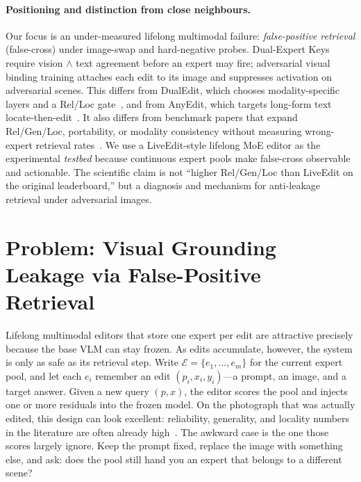 \documentclass[letterpaper]{article} %
\begin{document}
\paragraph{Positioning and distinction from close neighbours.}
Our focus is an under-measured lifelong multimodal failure: \emph{false-positive retrieval} (false-cross) under image-swap and hard-negative probes.
Dual-Expert Keys require vision $\wedge$ text agreement before an expert may fire; adversarial visual binding training attaches each edit to its image and suppresses activation on adversarial scenes.
This differs from DualEdit, which chooses modality-specific layers and a Rel/Loc gate~\citep{shi2025dualedit}, and from AnyEdit, which targets long-form text locate-then-edit~\citep{jiang2025anyedit}.
It also differs from benchmark papers that expand Rel/Gen/Loc, portability, or modality consistency without measuring wrong-expert retrieval rates~\citep{huang2024vlkeb,zhang2025mcmke,du2025mmkebench,ma2025comprehendedit}.
We use a LiveEdit-style lifelong MoE editor as the experimental \emph{testbed} because continuous expert pools make false-cross observable and actionable.
The scientific claim is not ``higher Rel/Gen/Loc than LiveEdit on the original leaderboard,'' but a diagnosis and mechanism for anti-leakage retrieval under adversarial images.

\section{Problem: Visual Grounding Leakage via False-Positive Retrieval}
\label{sec:problem}

Lifelong multimodal editors that store one expert per edit are attractive precisely because the base VLM can stay frozen.
As edits accumulate, however, the system is only as safe as its retrieval step.
Write $\mathcal{E}=\{e_1,\ldots,e_m\}$ for the current expert pool, and let each $e_i$ remember an edit $(p_i,x_i,y_i)$---a prompt, an image, and a target answer.
Given a new query $(p,x)$, the editor scores the pool and injects one or more residuals into the frozen model.
On the photograph that was actually edited, this design can look excellent: reliability, generality, and locality numbers in the literature are often already high~\cite{cheng2023mmedit,huang2024vlkeb,chen2025liveedit}.
The awkward case is the one those scores largely ignore.
Keep the prompt fixed, replace the image with something else, and ask: does the pool still hand you an expert that belongs to a different scene?
\end{document}
